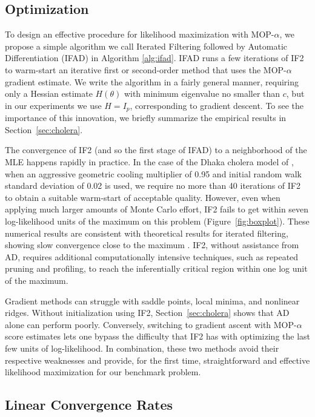 \documentclass[numsec,webpdf,modern,medium,namedate]{oup-authoring-template}
\newcommand\arxiv[2]{#2} %
\theoremstyle{thmstyleone}%
\theoremstyle{thmstyletwo}%
\theoremstyle{thmstylethree}%
\begin{document}
\subsection{Optimization}

To design an effective procedure for likelihood maximization with MOP-$\alpha$, we propose a simple algorithm we call Iterated Filtering followed by Automatic Differentiation (IFAD) in Algorithm \ref{alg:ifad}. IFAD runs a few iterations of IF2 to warm-start an iterative first or second-order method that uses the MOP-$\alpha$ gradient estimate.
We write the algorithm in a fairly general manner, requiring only a Hessian estimate $H(\theta)$ with minimum eigenvalue no smaller than $c$, but in our experiments we use $H=I_p$, corresponding to gradient descent.
To see the importance of this innovation, we briefly summarize the empirical results in Section~\ref{sec:cholera}.

The convergence of IF2 (and so the first stage of IFAD) to a neighborhood of the MLE happens rapidly in practice. 
In the case of the Dhaka cholera model of \cite{king08}, when an aggressive geometric cooling multiplier of 0.95 and initial random walk standard deviation of 0.02 is used, we require no more than 40 iterations of IF2 to obtain a suitable warm-start of acceptable quality. 
However, even when applying much larger amounts of Monte Carlo effort, IF2 fails to get within seven log-likelihood units of the maximum on this problem (Figure~\ref{fig:boxplot}).
These numerical results are consistent with theoretical results for iterated filtering, showing slow convergence close to the maximum \citep{doucet15-if}.
IF2, without assistance from AD, requires additional computationally intensive techniques, such as repeated pruning and profiling, to reach the inferentially critical region within one log unit of the maximum.

Gradient methods can struggle with saddle points, local minima, and nonlinear ridges.
Without initialization using IF2, Section~\ref{sec:cholera} shows that AD alone can perform poorly.
Conversely, switching to gradient ascent with MOP-$\alpha$ score estimates lets one bypass the difficulty that IF2 has with optimizing the last few units of log-likelihood. 
In combination, these two methods avoid their respective weaknesses and provide, for the first time, straightforward and effective likelihood maximization for our benchmark problem.

\arxiv{}{\vspace*{-2mm}}
\subsection{Linear Convergence Rates}
\end{document}
